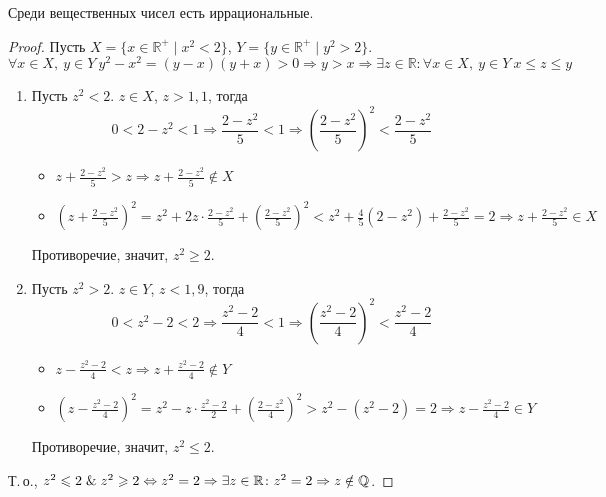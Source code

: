\begin{statement}
Среди вещественных чисел есть иррациональные.
\end{statement}
\begin{proof}
Пусть $X = \{ x \in \mathbb R^+ \mid x^2 < 2 \}$, $Y = \{ y \in \mathbb R^+ \mid y^2 > 2 \}$.
\begin{equation*}
\forall x \in X, \ y \in Y \ y^2 - x^2 = (y - x)(y + x) > 0 \Rightarrow y > x \Rightarrow
\exists z \in \mathbb R \colon \forall x \in X, \ y \in Y \ x \leqslant z \leqslant y
\end{equation*}

\begin{enumerate}
	\item Пусть $z^2 < 2$. $z \in X$, $z > 1{,}1$, тогда
	\begin{equation*}
	0 < 2 - z^2 < 1 \Rightarrow \frac{2 - z^2}5 < 1 \Rightarrow
	\left( \frac{2 - z^2}5 \right)^2 < \frac{2 - z^2}5
	\end{equation*}
	
	\begin{itemize}
		\item $\displaystyle z + \frac{2 - z^2}5 > z \Rightarrow z + \frac{2 - z^2}5 \notin X$
		
		\item $\displaystyle \left( z + \frac{2 - z^2}5 \right)^2 =
		z^2 + 2z\cdot\frac{2 - z^2}5 + \left( \frac{2 - z^2}5 \right)^2 <
		z^2 + \frac45 (2 - z^2) + \frac{2 - z^2}5 = 2 \Rightarrow z + \frac{2 - z^2}5 \in X$
	\end{itemize}
	Противоречие, значит, $z^2 \geqslant 2$.
	
	\item Пусть $z^2 > 2$. $z \in Y$, $z < 1{,}9$, тогда
	\begin{equation*}
	0 < z^2 - 2 < 2 \Rightarrow \frac{z^2 - 2}4 < 1 \Rightarrow
	\left( \frac{z^2 - 2}4 \right)^2 < \frac{z^2 - 2}4
	\end{equation*}
	
	\begin{itemize}
		\item $\displaystyle z - \frac{z^2 - 2}4 < z \Rightarrow z + \frac{z^2 - 2}4 \notin Y$
		
		\item $\displaystyle \left( z - \frac{z^2 - 2}4 \right)^2 =
		z^2 - z\cdot\frac{z^2 - 2}2 + \left( \frac{2 - z^2}4 \right)^2 >
		z^2 - (z^2 - 2) = 2 \Rightarrow z - \frac{z^2 - 2}4 \in Y$
	\end{itemize}
	
	Противоречие, значит, $z^2 \leqslant 2$.
\end{enumerate}

Т.\,о., $z^2 \leqslant 2 \mathrel{\&} z^2 \geqslant 2 \Leftrightarrow z^2 = 2 \Rightarrow
\exists z \in \mathbb R \colon z^2 = 2 \Rightarrow z \notin \mathbb Q$.
\end{proof}

